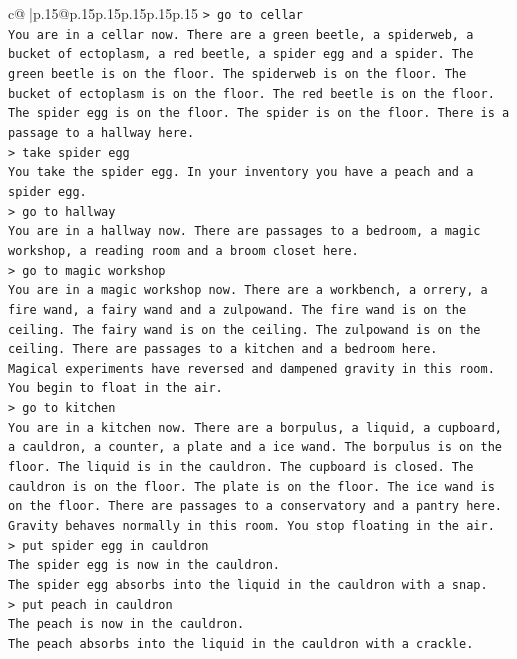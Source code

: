 \documentclass{article}
\begin{document}
{\begin{supertabular}{c@{$\;$}|p{.15\linewidth}@{}p{.15\linewidth}p{.15\linewidth}p{.15\linewidth}p{.15\linewidth}p{.15\linewidth}}
{{{\texttt{> go to cellar} \\
\texttt{You are in a cellar now. There are a green beetle, a spiderweb, a bucket of ectoplasm, a red beetle, a spider egg and a spider. The green beetle is on the floor. The spiderweb is on the floor. The bucket of ectoplasm is on the floor. The red beetle is on the floor. The spider egg is on the floor. The spider is on the floor. There is a passage to a hallway here.} \\
\texttt{> take spider egg} \\
\texttt{You take the spider egg. In your inventory you have a peach and a spider egg.} \\
\texttt{> go to hallway} \\
\texttt{You are in a hallway now. There are passages to a bedroom, a magic workshop, a reading room and a broom closet here.} \\
\texttt{> go to magic workshop} \\
\texttt{You are in a magic workshop now. There are a workbench, a orrery, a fire wand, a fairy wand and a zulpowand. The fire wand is on the ceiling. The fairy wand is on the ceiling. The zulpowand is on the ceiling. There are passages to a kitchen and a bedroom here.} \\
\texttt{Magical experiments have reversed and dampened gravity in this room. You begin to float in the air.} \\
\texttt{> go to kitchen} \\
\texttt{You are in a kitchen now. There are a borpulus, a liquid, a cupboard, a cauldron, a counter, a plate and a ice wand. The borpulus is on the floor. The liquid is in the cauldron. The cupboard is closed. The cauldron is on the floor. The plate is on the floor. The ice wand is on the floor. There are passages to a conservatory and a pantry here.} \\
\texttt{Gravity behaves normally in this room. You stop floating in the air.} \\
\texttt{> put spider egg in cauldron} \\
\texttt{The spider egg is now in the cauldron.} \\
\texttt{The spider egg absorbs into the liquid in the cauldron with a snap.} \\
\texttt{> put peach in cauldron} \\
\texttt{The peach is now in the cauldron.} \\
\texttt{The peach absorbs into the liquid in the cauldron with a crackle.} \\
}}}
\end{supertabular}}
\end{document}
